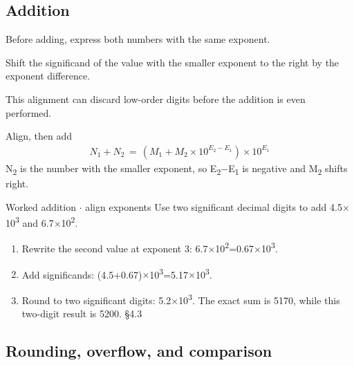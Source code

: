 \documentclass[11pt]{article}
\begin{document}
\begin{keepsection}
\begin{keepsection}
\subsection{Addition}

Before adding, express both numbers with the same exponent.

Shift the significand of the value with the smaller exponent to the right by the exponent difference.

This alignment can discard low-order digits before the addition is even performed.

\begin{equationcard}{Align, then add}
\[ \begin{gathered} {N}_{1}+{N}_{2}\, =\, ({M}_{1}+{M}_{2}\times 10^{{E}_{2}-{E}_{1}})\times 10^{{E}_{1}} \end{gathered} \]
{\small N\textsubscript{2} is the number with the smaller exponent, so E\textsubscript{2}\ensuremath{-}E\textsubscript{1} is negative and M\textsubscript{2} shifts right.}
\end{equationcard}

\begin{workedbox}{Worked addition \ensuremath{\cdot} align exponents}
Use two significant decimal digits to add 4.5\ensuremath{\times}10\textsuperscript{3} and 6.7\ensuremath{\times}10\textsuperscript{2}.

\begin{enumerate}
\item Rewrite the second value at exponent 3: 6.7\ensuremath{\times}10\textsuperscript{2}=0.67\ensuremath{\times}10\textsuperscript{3}.
\item Add significands: (4.5+0.67)\ensuremath{\times}10\textsuperscript{3}=5.17\ensuremath{\times}10\textsuperscript{3}.
\item Round to two significant digits: 5.2\ensuremath{\times}10\textsuperscript{3}. The exact sum is 5170, while this two-digit result is 5200. \hfill{\small\color{FAUblue}§4.3}
\end{enumerate}
\end{workedbox}
\end{keepsection}

\begin{keepsection}
\subsection{Rounding, overflow, and comparison}


\end{keepsection}
\end{keepsection}
\end{document}
